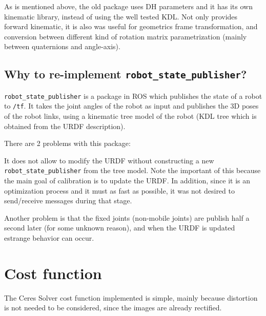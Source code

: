 As is mentioned above, the old package uses DH parameters and it has its own kinematic library, instead of using the well tested KDL. Not only provides forward kinematic, it is also was useful for geometrics frame transformation, and conversion between different kind of rotation matrix parametrization (mainly between quaternions and angle-axis).



\subsection{Why to re-implement \texttt{robot\_state\_publisher}?}

\texttt{robot\_state\_publisher} is a package in ROS which publishes the state of a robot to \texttt{/tf}. It takes the joint angles of the robot as input and publishes the 3D poses of the robot links, using a kinematic tree model of the robot (KDL tree which is obtained from the URDF description).

There are 2 problems with this package:
\begin{itemize*}
 \item It does not allow to modify the URDF without constructing a new \texttt{robot\_state\_publisher} from the tree model. Note the important of this because the main goal of calibration is to update the URDF. In addition, since it is an optimization process and it must as fast as possible, it was not desired to send/receive messages during that stage.

 \item Another problem is that the fixed joints (non-mobile joints) are publish half a second later (for some unknown reason), and when the URDF is updated estrange behavior can occur.
\end{itemize*}

%
%
%
%
%



\section{Cost function}
\label{sec:ceres_impl}

The Ceres Solver cost function implemented is simple, mainly because distortion is not needed to be considered, since the images are already rectified.

